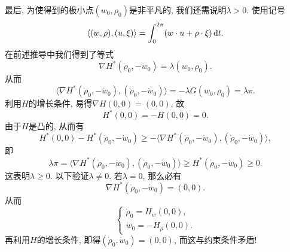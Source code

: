 \documentclass[12pt,a4paper]{article}
\begin{document}
最后, 为使得到的极小点$(w_0, \rho_0)$是非平凡的, 我们还需说明$\lambda > 0$.
使用记号 
\begin{equation*}
    \langle (w, \rho), (u, \xi)\rangle = \int_0^{2\pi}(w \cdot u + \rho \cdot \xi) \,{\rm d}t.
\end{equation*}
在前述推导中我们得到了等式 
\begin{equation*}
    \nabla H^*(\dot \rho_0, -\dot w_0) = \lambda(w_0, \rho_0).
\end{equation*}
从而 
\begin{equation*}
    \langle \nabla H^*(\dot \rho_0, -\dot w_0), (\dot\rho_0, -\dot w_0)\rangle = -\lambda G(w_0, \rho_0) = \lambda\pi.
\end{equation*}
利用$H$的增长条件, 易得$\nabla H(0, 0) = (0, 0)$, 故 
\begin{equation*}
    H^*(0, 0) = -H(0, 0) = 0.
\end{equation*}
由于$H$是凸的, 从而有 
\begin{equation*}
    H^*(0, 0) - H^*(\dot\rho_0, -\dot w_0) \geq -\langle \nabla H^*(\dot\rho_0, -\dot w_0), (\dot \rho_0, -\dot w_0)\rangle,
\end{equation*}
即 
\begin{equation*}
    \lambda\pi = \langle \nabla H^*(\dot\rho_0, -\dot w_0), (\dot \rho_0, -\dot w_0)\rangle \geq H^*(\dot\rho_0, -\dot w_0) \geq 0.
\end{equation*}
这表明$\lambda \geq 0$. 以下验证$\lambda \neq 0$. 若$\lambda = 0$, 那么必有 
\begin{equation*}
    \nabla H^*(\dot\rho_0, -\dot w_0) = (0, 0).
\end{equation*}
从而 
\begin{equation*}
    \begin{cases}
        \dot\rho_0 = H_w(0, 0), \\ 
        \dot w_0 = -H_{\rho}(0, 0).
    \end{cases}
\end{equation*}
再利用$H$的增长条件, 即得$(\dot\rho_0, \dot w_0) = (0, 0)$, 而这与约束条件矛盾!
\end{document}
